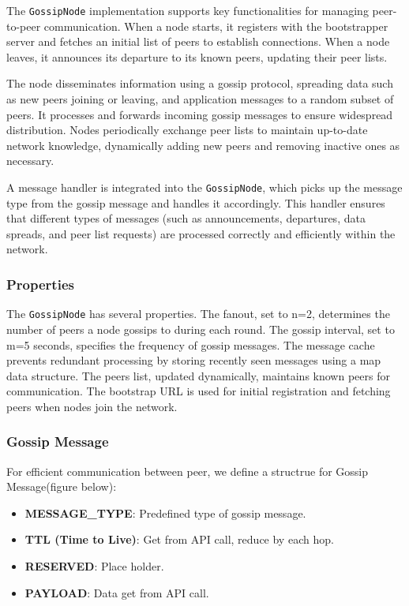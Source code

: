The \texttt{GossipNode} implementation supports key functionalities for managing peer-to-peer communication. When a node starts, it registers with the bootstrapper server and fetches an initial list of peers to establish connections. When a node leaves, it announces its departure to its known peers, updating their peer lists.

The node disseminates information using a gossip protocol, spreading data such as new peers joining or leaving, and application messages to a random subset of peers. It processes and forwards incoming gossip messages to ensure widespread distribution. Nodes periodically exchange peer lists to maintain up-to-date network knowledge, dynamically adding new peers and removing inactive ones as necessary. 

A message handler is integrated into the \texttt{GossipNode}, which picks up the message type from the gossip message and handles it accordingly. This handler ensures that different types of messages (such as announcements, departures, data spreads, and peer list requests) are processed correctly and efficiently within the network.

\subsubsection{Properties}

The \texttt{GossipNode} has several properties. The fanout, set to n=2, determines the number of peers a node gossips to during each round. The gossip interval, set to m=5 seconds, specifies the frequency of gossip messages. The message cache prevents redundant processing by storing recently seen messages using a map data structure. The peers list, updated dynamically, maintains known peers for communication. The bootstrap URL is used for initial registration and fetching peers when nodes join the network.


\subsubsection{Gossip Message}

For efficient communication between peer, we define a structrue for Gossip Message(figure below):

\begin{itemize}
    \item \textbf{MESSAGE\_TYPE}:  Predefined type of gossip message.
    \item \textbf{TTL (Time to Live)}:  Get from API call, reduce by each hop.
    \item \textbf{RESERVED}: Place holder.
    \item \textbf{PAYLOAD}:  Data get from API call.
\end{itemize}


